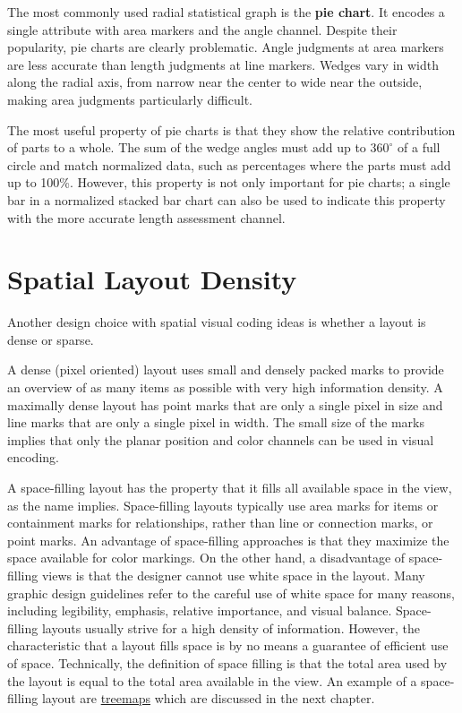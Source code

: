 \documentclass[
]{book}
\begin{document}
The most commonly used radial statistical graph is the \textbf{pie chart}. It encodes a single attribute with area markers and the angle channel. Despite their popularity, pie charts are clearly problematic. Angle judgments at area markers are less accurate than length judgments at line markers. Wedges vary in width along the radial axis, from narrow near the center to wide near the outside, making area judgments particularly difficult.

The most useful property of pie charts is that they show the relative contribution of parts to a whole. The sum of the wedge angles must add up to \(360^{\circ}\) of a full circle and match normalized data, such as percentages where the parts must add up to 100\%. However, this property is not only important for pie charts; a single bar in a normalized stacked bar chart can also be used to indicate this property with the more accurate length assessment channel.

\hypertarget{spatial-layout-density}{%
\section{Spatial Layout Density}\label{spatial-layout-density}}

Another design choice with spatial visual coding ideas is whether a layout is dense or sparse.

A dense (pixel oriented) layout uses small and densely packed marks to provide an overview of as many items as possible with very high information density. A maximally dense layout has point marks that are only a single pixel in size and line marks that are only a single pixel in width. The small size of the marks implies that only the planar position and color channels can be used in visual encoding.

A space-filling layout has the property that it fills all available space in the view, as the name implies. Space-filling layouts typically use area marks for items or containment marks for relationships, rather than line or connection marks, or point marks. An advantage of space-filling approaches is that they maximize the space available for color markings. On the other hand, a disadvantage of space-filling views is that the designer cannot use white space in the layout. Many graphic design guidelines refer to the careful use of white space for many reasons, including legibility, emphasis, relative importance, and visual balance. Space-filling layouts usually strive for a high density of information. However, the characteristic that a layout fills space is by no means a guarantee of efficient use of space. Technically, the definition of space filling is that the total area used by the layout is equal to the total area available in the view. An example of a space-filling layout are \href{treemap}{treemaps} which are discussed in the next chapter.

  
\end{document}
